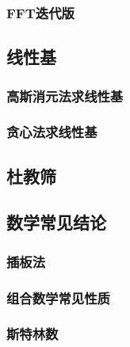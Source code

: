 \documentclass[10pt,a4paper]{article}
\begin{document}
\subsubsection{FFT迭代版}

\subsection{线性基}
\subsubsection{高斯消元法求线性基}
\begin{spacing}{1.5}

\end{spacing}

\subsubsection{贪心法求线性基}
\begin{spacing}{1.5}

\end{spacing}

\subsection{杜教筛}
\begin{spacing}{1.5}

\end{spacing}

\subsection{数学常见结论}
\subsubsection{插板法}
\begin{spacing}{1.5}

\end{spacing}
\subsubsection{组合数学常见性质}
\begin{spacing}{1.5}

\end{spacing}
\subsubsection{斯特林数}
\begin{spacing}{1.5}

\end{spacing}
\end{document}
